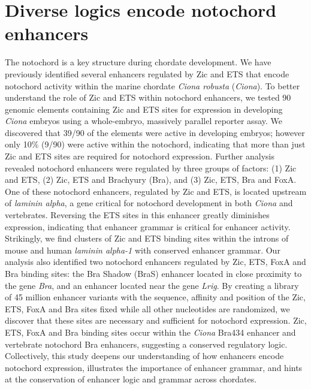 \chapter{Diverse logics encode notochord enhancers}

The notochord is a key structure during chordate development. We have previously identified several enhancers regulated by Zic and ETS that encode notochord activity within the marine chordate \textit{\textit{Ciona} robusta} (\textit{Ciona}). To better understand the role of Zic and ETS within notochord enhancers, we tested 90 genomic elements containing Zic and ETS sites for expression in developing \textit{Ciona} embryos using a whole-embryo, massively parallel reporter assay. We discovered that 39/90 of the elements were active in developing embryos; however only 10\% (9/90) were active within the notochord, indicating that more than just Zic and ETS sites are required for notochord expression. Further analysis revealed notochord enhancers were regulated by three groups of factors: (1) Zic and ETS, (2) Zic, ETS and Brachyury (Bra), and (3) Zic, ETS, Bra and FoxA. One of these notochord enhancers, regulated by Zic and ETS, is located upstream of \textit{laminin alpha}, a gene critical for notochord development in both \textit{Ciona} and vertebrates. Reversing the ETS sites in this enhancer greatly diminishes expression, indicating that enhancer grammar is critical for enhancer activity. Strikingly, we find clusters of Zic and ETS binding sites within the introns of mouse and human \textit{laminin alpha-1} with conserved enhancer grammar. Our analysis also identified two notochord enhancers regulated by Zic, ETS, FoxA and Bra binding sites: the Bra Shadow (BraS) enhancer located in close proximity to the gene \textit{Bra}, and an enhancer located near the gene \textit{Lrig}. By creating a library of 45 million enhancer variants with the sequence, affinity and position of the Zic, ETS, FoxA and Bra sites fixed while all other nucleotides are randomized, we discover that these sites are necessary and sufficient for notochord expression. Zic, ETS, FoxA and Bra binding sites occur within the \textit{Ciona} Bra434 enhancer and vertebrate notochord Bra enhancers, suggesting a conserved regulatory logic. Collectively, this study deepens our understanding of how enhancers encode notochord expression, illustrates the importance of enhancer grammar, and hints at the conservation of enhancer logic and grammar across chordates. 

